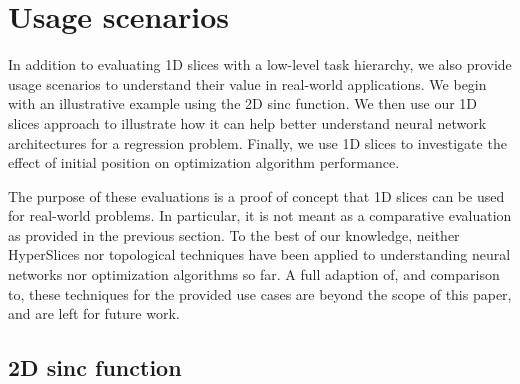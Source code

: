 
\section{Usage scenarios}\label{sec:usage-scenarios}

In addition to evaluating 1D slices with a low-level task hierarchy, we also
provide usage scenarios to understand their value in real-world applications.
We begin with an illustrative example using the 2D sinc
function.
We then use our 1D slices approach to illustrate how
it can help better understand neural network architectures for a regression
problem. Finally, we use 1D slices to investigate the effect of initial
position on optimization algorithm performance.

The purpose of these evaluations is a proof of concept that 1D slices can be
used for real-world problems. In particular, it is not meant as a comparative
evaluation as provided in the previous section. To the best of our knowledge,
neither HyperSlices nor topological techniques have been applied to
understanding neural networks nor optimization algorithms so far. A full
adaption of, and comparison to, these techniques for the provided use cases are
beyond the scope of this paper, and are left for future work. 

\subsection{2D sinc function}

